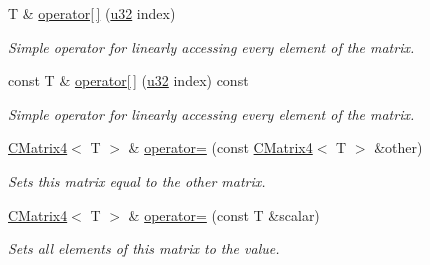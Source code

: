 \begin{DoxyCompactItemize}
\mbox{\label{classirr_1_1core_1_1CMatrix4_aead4909f8bb2ab40875af175caf0085f}} 
T \& \hyperlink{classirr_1_1core_1_1CMatrix4_aead4909f8bb2ab40875af175caf0085f}{operator\mbox{[}$\,$\mbox{]}} (\hyperlink{namespaceirr_a0416a53257075833e7002efd0a18e804}{u32} index)
\begin{DoxyCompactList}\small\item\em Simple operator for linearly accessing every element of the matrix. \end{DoxyCompactList}\item 
\mbox{\label{classirr_1_1core_1_1CMatrix4_a9e34c4b4872d7f8fe587eff776585270}} 
const T \& \hyperlink{classirr_1_1core_1_1CMatrix4_a9e34c4b4872d7f8fe587eff776585270}{operator\mbox{[}$\,$\mbox{]}} (\hyperlink{namespaceirr_a0416a53257075833e7002efd0a18e804}{u32} index) const
\begin{DoxyCompactList}\small\item\em Simple operator for linearly accessing every element of the matrix. \end{DoxyCompactList}\item 
\mbox{\label{classirr_1_1core_1_1CMatrix4_a47571eb3acae9a6aa330a03edcea7896}} 
\hyperlink{classirr_1_1core_1_1CMatrix4}{C\+Matrix4}$<$ T $>$ \& \hyperlink{classirr_1_1core_1_1CMatrix4_a47571eb3acae9a6aa330a03edcea7896}{operator=} (const \hyperlink{classirr_1_1core_1_1CMatrix4}{C\+Matrix4}$<$ T $>$ \&other)
\begin{DoxyCompactList}\small\item\em Sets this matrix equal to the other matrix. \end{DoxyCompactList}\item 
\mbox{\label{classirr_1_1core_1_1CMatrix4_aa77c0ec30f4e42f7281392440898e9e3}} 
\hyperlink{classirr_1_1core_1_1CMatrix4}{C\+Matrix4}$<$ T $>$ \& \hyperlink{classirr_1_1core_1_1CMatrix4_aa77c0ec30f4e42f7281392440898e9e3}{operator=} (const T \&scalar)
\begin{DoxyCompactList}\small\item\em Sets all elements of this matrix to the value. \end{DoxyCompactList}\item 
\mbox{\label{classirr_1_1core_1_1CMatrix4_a4d258434b1baa3a52f1ae35903ca97f9}} 

\end{DoxyCompactItemize}
